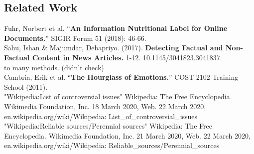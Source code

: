 \documentclass[11pt]{article}
\begin{document}
\begin{multicols}{2}
\section{Related Work}
\noindent[1]  Fuhr, Norbert et al. “\textbf{An Information Nutritional Label for Online Documents.}” SIGIR Forum 51 (2018): 46-66. \\

\noindent [2] Sahu, Ishan \& Majumdar, Debapriyo. (2017). \textbf{Detecting Factual and Non-Factual Content in News Articles.} 1-12. 10.1145/3041823.3041837. \\

\noindent [3] to many methods. (didn't check) \\

\noindent[4]  Cambria, Erik et al. “\textbf{The Hourglass of Emotions.}” COST 2102 Training School (2011).\\

\noindent [5]  "Wikipedia:List of controversial issues" Wikipedia: The Free Encyclopedia. Wikimedia Foundation, Inc. 18 March 2020, Web. 22 March 2020, en.wikipedia.org/wiki/Wikipedia: List\_of\_controversial\_issues \\

\noindent[6]  "Wikipedia:Reliable sources/Perennial sources" Wikipedia: The Free Encyclopedia. Wikimedia Foundation, Inc. 21 March 2020, Web. 22 March 2020, en.wikipedia.org/wiki/Wikipedia: Reliable\_sources/Perennial\_sources \\
  



  

\end{multicols}
\end{document}
